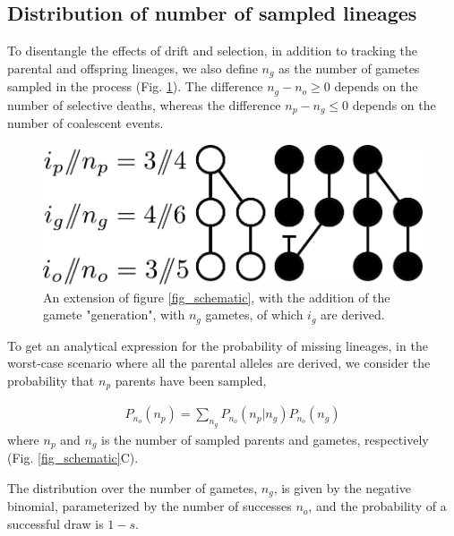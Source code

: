 \documentclass[9pt,twocolumn,twoside,lineno]{gsajnl}
\begin{document}
\subsection{Distribution of number of sampled lineages}
\label{parent_distribution}

To disentangle the effects of drift and selection, in addition to tracking the parental and
offspring lineages, we also define $n_g$ as the number of gametes sampled in the process (Fig.
\ref{fig_schematic_gametes}). The difference $n_g-n_o \ge 0$ depends on the number of selective
deaths, whereas the difference $n_p-n_g \le 0$ depends on the number of coalescent events.

\begin{figure}
  \centering
  \includegraphics[width=\columnwidth]{fig/schematic-gametes.pdf}

  \caption{\label{fig_schematic_gametes}
    An extension of figure \ref{fig_schematic}, with the addition of the gamete
    "generation", with $n_g$ gametes, of which $i_g$ are derived.  }
\end{figure}

To get an analytical expression for the probability of missing lineages, in the worst-case scenario
where all the parental alleles are derived, we consider the probability that $n_p$ parents have been
sampled,

\begin{equation}
  \begin{aligned}
    \label{eq_conditional}
    P_{n_o}(n_p) = \sum_{n_g} P_{n_o}(n_p | n_g)P_{n_o}(n_g)
  \end{aligned}
\end{equation}
where $n_p$ and $n_g$ is the number of sampled parents and gametes, respectively (Fig.
\ref{fig_schematic}C).

The distribution over the number of gametes, $n_g$, is given by the negative binomial,
parameterized by the number of successes $n_o$, and the probability of a successful draw is $1-s$.
\end{document}

